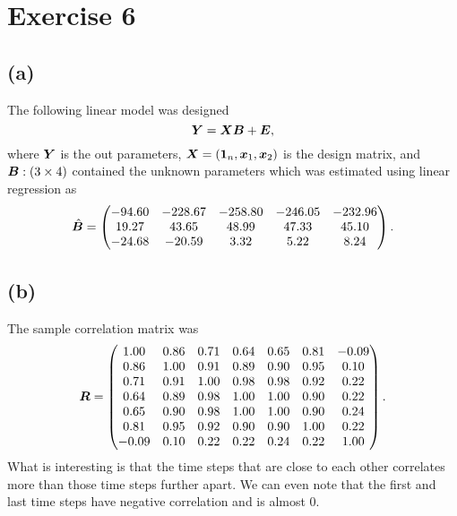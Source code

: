 \section*{Exercise 6}
\label{sec:exercise-6}

\subsection*{(a)}
\label{sec:a-5}


The following linear model was designed
\begin{equation*}
  \bm{Y} = \bm{XB} + \bm{E},
\end{equation*}
where $\bm{Y}$ is the out parameters, $\bm{X} = (\bm{1}_n, \bm{x}_1, \bm{x}_2)$
is the design matrix, and $\bm{B}:(3 \times 4) $ contained the unknown parameters which
was estimated using linear regression as
\begin{equation*}
  \hat{\bm{B}} =
  \begin{pmatrix}
    -94.60 &-228.67 &-258.80 &-246.05 &-232.96 \\ 
    19.27 &43.65 &48.99 &47.33 &45.10 \\ 
    -24.68 &-20.59 &3.32 &5.22 &8.24 
  \end{pmatrix}.
\end{equation*}

\subsection*{(b)}
The sample correlation matrix was 
\begin{equation*}
  \bm{R} =
  \begin{pmatrix}
    1.00 &0.86 &0.71 &0.64 &0.65 &0.81 &-0.09 \\ 
    0.86 &1.00 &0.91 &0.89 &0.90 &0.95 &0.10 \\ 
    0.71 &0.91 &1.00 &0.98 &0.98 &0.92 &0.22 \\ 
    0.64 &0.89 &0.98 &1.00 &1.00 &0.90 &0.22 \\ 
    0.65 &0.90 &0.98 &1.00 &1.00 &0.90 &0.24 \\ 
    0.81 &0.95 &0.92 &0.90 &0.90 &1.00 &0.22 \\ 
    -0.09 &0.10 &0.22 &0.22 &0.24 &0.22 &1.00  
  \end{pmatrix}.
\end{equation*}
What is interesting is that the time steps that are close to each other
correlates more than those time steps further apart. We can even note that
the first and last time steps have negative correlation and is almost 0.

